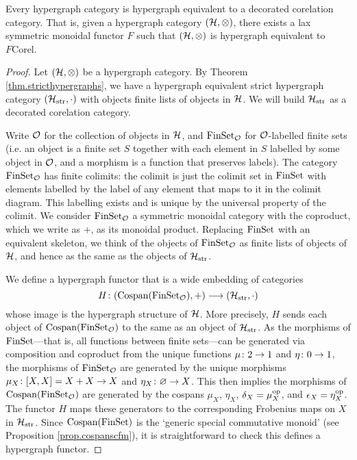 \begin{theorem}\label{thm.hypdeccorcats}
  Every hypergraph category is hypergraph equivalent to a decorated corelation
  category. That is, given a hypergraph category $(\mathcal H,\otimes)$, there exists
  a lax symmetric monoidal functor $F$ such that $(\mathcal H,\otimes)$ is hypergraph
  equivalent to $F\mathrm{Corel}$.
\end{theorem}
\begin{proof}
  Let $(\mathcal H,\otimes)$ be a hypergraph category. By Theorem
  \ref{thm.stricthypergraphs}, we have a hypergraph equivalent strict hypergraph
  category $(\mathcal H_{\mathrm{str}},\cdot)$ with objects finite lists of objects
  in $\mathcal H$. We will build $\mathcal H_{\mathrm{str}}$ as a decorated corelation
  category.
  
  Write $\mathcal O$ for the collection of objects in $\mathcal H$, and $\mathrm{FinSet}_{\mathcal
  O}$ for $\mathcal O$-labelled finite sets (i.e. an object is a finite set $S$
  together with each element in $S$ labelled by some object in $\mathcal O$, and a
  morphism is a function that preserves labels). The category $\mathrm{FinSet}_{\mathcal O}$
  has finite colimits: the colimit is just the colimit set in $\mathrm{FinSet}$ with
  elements labelled by the label of any element that maps to it in the colimit
  diagram. This labelling exists and is unique by the universal property of the
  colimit. We consider $\mathrm{FinSet}_{\mathcal O}$ a symmetric monoidal category with
  the coproduct, which we write as $+$, as its monoidal product.  Replacing
  $\mathrm{FinSet}$ with an equivalent skeleton, we think of the objects of
  $\mathrm{FinSet}_{\mathcal O}$ as finite lists of objects of $\mathcal H$, and hence as the same
  as the objects of $\mathcal H_{\mathrm{str}}$.

  We define a hypergraph functor that is a wide embedding of categories
  \[
    H{\colon} (\operatorname{{Cospan}}(\mathrm{FinSet}_{\mathcal O}),+) \longrightarrow (\mathcal
    H_{\mathrm{str}},\cdot)
  \]
  whose image is the hypergraph structure of $\mathcal H$. More precisely, $H$ sends
  each object of $\operatorname{{Cospan}}(\mathrm{FinSet}_{\mathcal O})$ to the same as an object of $\mathcal
  H_{\mathrm{str}}$. As the morphisms of $\mathrm{FinSet}$---that is, all functions
  between finite sets---can be generated via composition and coproduct from the
  unique functions $\mu {\colon} 2 \to 1$ and $\eta {\colon} 0 \to 1$, the morphisms
  of $\mathrm{FinSet}_{\mathcal O}$ are generated by the unique morphisms $\mu_X{\colon}
  [X,X]=X+X \to X$ and $\eta_X{\colon} \varnothing \to X$.  This then implies the
  morphisms of $\operatorname{{Cospan}}(\mathrm{FinSet}_{\mathcal O})$ are generated by the cospans $\mu_X$,
  $\eta_X$, $\delta_X = \mu_X^{\mathrm{op}}$, and $\epsilon_X = \eta_X^{\mathrm{op}}$. The functor
  $H$ maps these generators to the corresponding Frobenius maps on $X$ in $\mathcal
  H_{\mathrm{str}}$. Since $\operatorname{{Cospan}}(\mathrm{FinSet})$ is the `generic special
  commutative monoid' (see Proposition \ref{prop.cospanscfm}), it is
  straightforward to check this defines a hypergraph functor.


\end{proof}
